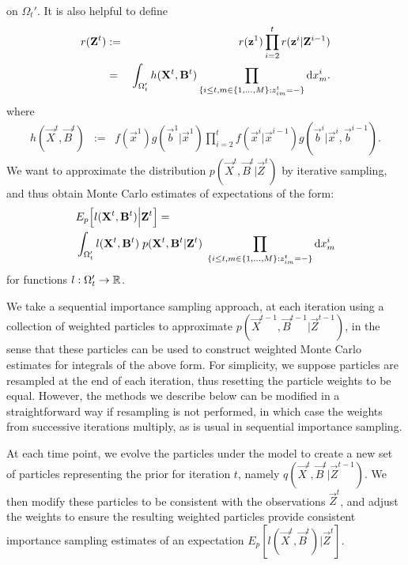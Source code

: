on $\Omega_t'$. It is also helpful to define
\begin{eqnarray*}
r(\mathbf{Z}^t) & := & r(\mathbf{z}^1) \prod_{i=2}^{t} r(\mathbf{z}^i | \mathbf{Z}^{i-1}) \\
& = & \int_{\Omega_t'}  h(\mathbf{X}^t,\mathbf{B}^t) \prod_{ \{ i \leq t, m \in \{1, \ldots, M \} : z^t_{im} = - \} } \mathrm{d} x^i_m.
\end{eqnarray*}
where
\begin{eqnarray*}
h(\vec{X}^t,\vec{B}^t) & := & f(\vec{x}^1)g(\vec{b}^1 | \vec{x}^1) \prod_{i=2}^{t} f(\vec{x}^i | \vec{x}^{i-1}) g(\vec{b}^i | \vec{x}^i , \vec{b}^{i-1}).
\end{eqnarray*}
We want to approximate the distribution $p(\vec{X}^{t}, \vec{B}^{t} | \vec{Z}^{t})$ by iterative sampling, and thus obtain Monte Carlo estimates of expectations of the form:
\begin{align*}
    &E_{p} \Big[l(\mathbf{X}^{t}, \mathbf{B}^{t} ) \Big| \mathbf{Z}^{t} \Big] = \\
    &\int_{\Omega_t'} l(\mathbf{X}^{t}, \mathbf{B}^{t})\; p(\mathbf{X}^{t}, \mathbf{B}^{t} | \mathbf{Z}^{t})\; \prod_{ \{ i \leq t, m \in \{1, \ldots, M \} : z^t_{im} = - \} } \mathrm{d} x^i_m
\end{align*}
for functions $l: \Omega_t' \rightarrow \mathbb R$. 

We take a sequential importance sampling approach, at each iteration using a collection of weighted particles to approximate $p(\vec{X}^{t-1}, \vec{B}^{t-1} | \vec{Z}^{t-1})$, in the sense that these particles can be used to construct weighted Monte Carlo estimates for integrals of the above form. For simplicity, we suppose particles are resampled at the end of each iteration, thus resetting the particle weights to be equal. However, the methods we describe below can be modified in a straightforward way if resampling is not performed, in which case the weights from successive iterations multiply, as is usual in sequential importance sampling.

At each time point, we evolve the particles under the model to create a new set of particles representing the prior for iteration $t$, namely $q(\vec{X}^{t}, \vec{B}^{t} | \vec{Z}^{t-1})$. We then modify these particles to be consistent with the observations $\vec{Z}^{t}$, and adjust the weights to ensure the resulting weighted particles provide consistent importance sampling estimates of an expectation $E_{p}[l(\vec{X}^{t}, \vec{B}^t) | \vec{Z}^t]$.

